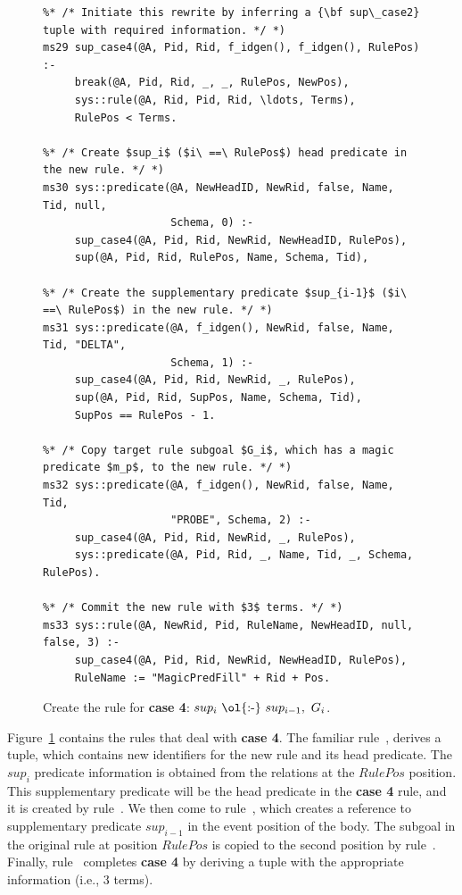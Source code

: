 \begin{figure}
\ssp
\centering
\begin{lstlisting}
%* /* Initiate this rewrite by inferring a {\bf sup\_case2} tuple with required information. */ *)
ms29 sup_case4(@A, Pid, Rid, f_idgen(), f_idgen(), RulePos) :-
     break(@A, Pid, Rid, _, _, RulePos, NewPos),
     sys::rule(@A, Rid, Pid, Rid, \ldots, Terms),
     RulePos < Terms.
	
%* /* Create $sup_i$ ($i\ ==\ RulePos$) head predicate in the new rule. */ *)
ms30 sys::predicate(@A, NewHeadID, NewRid, false, Name, Tid, null, 
                    Schema, 0) :-
     sup_case4(@A, Pid, Rid, NewRid, NewHeadID, RulePos),
     sup(@A, Pid, Rid, RulePos, Name, Schema, Tid),
	
%* /* Create the supplementary predicate $sup_{i-1}$ ($i\ ==\ RulePos$) in the new rule. */ *)
ms31 sys::predicate(@A, f_idgen(), NewRid, false, Name, Tid, "DELTA", 
                    Schema, 1) :-
     sup_case4(@A, Pid, Rid, NewRid, _, RulePos),
     sup(@A, Pid, Rid, SupPos, Name, Schema, Tid),
     SupPos == RulePos - 1.

%* /* Copy target rule subgoal $G_i$, which has a magic predicate $m_p$, to the new rule. */ *)
ms32 sys::predicate(@A, f_idgen(), NewRid, false, Name, Tid, 
                    "PROBE", Schema, 2) :-
     sup_case4(@A, Pid, Rid, NewRid, _, RulePos),
     sys::predicate(@A, Pid, Rid, _, Name, Tid, _, Schema, RulePos).
	
%* /* Commit the new rule with $3$ terms. */ *)
ms33 sys::rule(@A, NewRid, Pid, RuleName, NewHeadID, null, false, 3) :-
     sup_case4(@A, Pid, Rid, NewRid, NewHeadID, RulePos),
     RuleName := "MagicPredFill" + Rid + Pos.
\end{lstlisting}
\caption{\label{ch:magic:fig:rewrite7} 
Create the rule for {\bf case 4}: $sup_i\ \text{\ol{:-}}\ sup_{i-1},\ G_i$. } 
\end{figure}

Figure~\ref{ch:magic:fig:rewrite7} contains the rules that deal with {\bf case
4}.  The familiar rule~, derives a  tuple, which
contains new identifiers for the new rule and its head predicate.  The $sup_i$
predicate information is obtained from the  relations at the $RulePos$
position.  This supplementary predicate will be the head predicate in the {\bf
case 4} rule, and it is created by rule~.  We then come to
rule~, which creates a reference to supplementary predicate
$sup_{i-1}$ in the event position of the body.  The subgoal in the original
rule at position $RulePos$ is copied to the second position by rule~.
Finally, rule~ completes {\bf case 4} by deriving a  tuple
with the appropriate information (i.e., $3$ terms).


